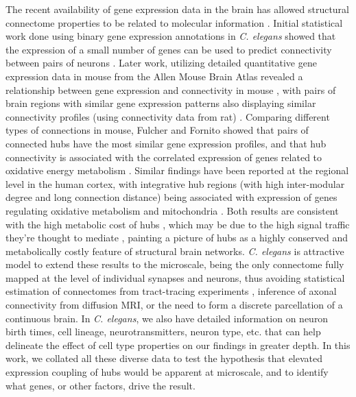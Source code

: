 \documentclass[10pt,letterpaper]{article}
\begin{document}
The recent availability of gene expression data in the brain has allowed structural connectome properties to be related to molecular information \cite{vandenHeuvel:2017ex}.
Initial statistical work done using binary gene expression annotations in \emph{C. elegans} showed that the expression of a small number of genes can be used to predict connectivity between pairs of neurons \cite{Varadan:2006ek, Kaufman2006, Baruch2008b}.
Later work, utilizing detailed quantitative gene expression data in mouse from the Allen Mouse Brain Atlas \cite{Lein:2007jn} revealed a relationship between gene expression and connectivity in mouse \cite{Ji:2014jw, Fakhry:2015kl}, with pairs of brain regions with similar gene expression patterns also displaying similar connectivity profiles (using connectivity data from rat) \cite{French2011}.
Comparing different types of connections in mouse, Fulcher and Fornito showed that pairs of connected hubs have the most similar gene expression profiles, and that hub connectivity is associated with the correlated expression of genes related to oxidative energy metabolism \cite{Fulcher:2016ck}.
Similar findings have been reported at the regional level in the human cortex, with integrative hub regions (with high inter-modular degree and long connection distance) being associated with expression of genes regulating oxidative metabolism and mitochondria \cite{Vertes2016a}.
Both results are consistent with the high metabolic cost of hubs \cite{Collin:2014kq, Tomasi:2013kl}, which may be due to the high signal traffic they're thought to mediate \cite{vandenHeuvel:2012kh, Misic:2014it}, painting a picture of hubs as a highly conserved and metabolically costly feature of structural brain networks.
\emph{C. elegans} is attractive model to extend these results to the microscale, being the only connectome fully mapped at the level of individual synapses and neurons, thus avoiding statistical estimation of connectomes from tract-tracing experiments \cite{Ypma:2016em}, inference of axonal connectivity from diffusion MRI, or the need to form a discrete parcellation of a continuous brain.
In \emph{C. elegans}, we also have detailed information on neuron birth times, cell lineage, neurotransmitters, neuron type, etc. that can help delineate the effect of cell type properties on our findings in greater depth.
In this work, we collated all these diverse data to test the hypothesis that elevated expression coupling of hubs would be apparent at microscale, and to identify what genes, or other factors, drive the result.
\end{document}
